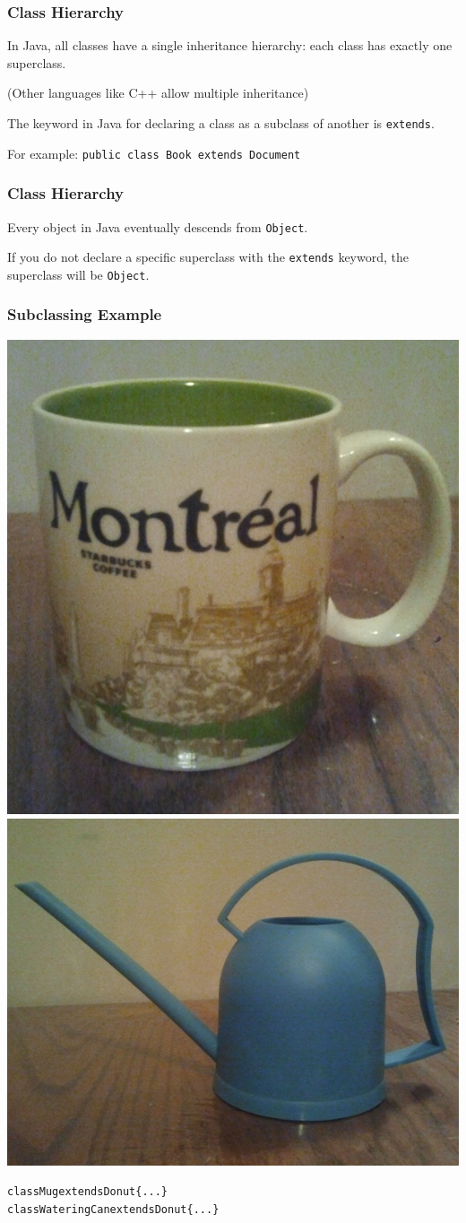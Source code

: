 \begin{frame}
\frametitle{Class Hierarchy}
\begin{changemargin}{1cm}
In Java, all classes have a single inheritance hierarchy: each class has exactly one superclass. 

(Other languages like C++ allow multiple inheritance) 

The keyword in Java for declaring a class as a subclass of another is \texttt{extends}.

For example: \texttt{public class Book extends Document}

\end{changemargin}
\end{frame}

\begin{frame}
\frametitle{Class Hierarchy}
\begin{changemargin}{1cm}
Every object in Java eventually descends from \texttt{Object}.

If you do not declare a specific superclass with the \texttt{extends} keyword, the superclass will be \texttt{Object}.
\end{changemargin}
\end{frame}

\begin{frame}
\frametitle{Subclassing Example}

\begin{center}
\includegraphics[width=.3\textwidth]{images/mug-scaled}
\includegraphics[width=.41\textwidth]{images/wateringcan-scaled.jpg}
\end{center}

\begin{alltt}
  class Mug \alert{extends} Donut \{ ... \}\\
  class WateringCan \alert{extends} Donut \{ ... \}
\end{alltt}

\end{frame}

